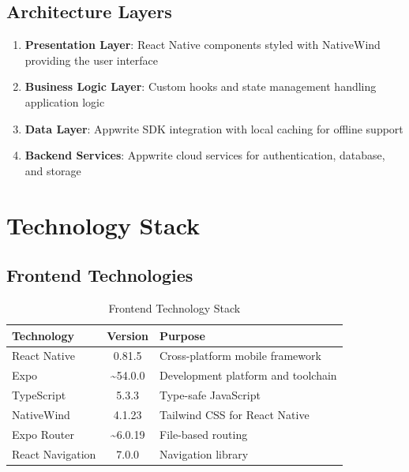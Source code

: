 \documentclass[11pt,a4paper,oneside]{book}
\begin{document}
\section{Architecture Layers}

\begin{enumerate}
    \item \textbf{Presentation Layer}: React Native components styled with NativeWind providing the user interface
    \item \textbf{Business Logic Layer}: Custom hooks and state management handling application logic
    \item \textbf{Data Layer}: Appwrite SDK integration with local caching for offline support
    \item \textbf{Backend Services}: Appwrite cloud services for authentication, database, and storage
\end{enumerate}

\chapter{Technology Stack}

\section{Frontend Technologies}

\begin{table}[h]
\centering
\begin{tabularx}{\textwidth}{l c X}
\toprule
\textbf{Technology} & \textbf{Version} & \textbf{Purpose} \\
\midrule
React Native & 0.81.5 & Cross-platform mobile framework \\
Expo & \textasciitilde{}54.0.0 & Development platform and toolchain \\
TypeScript & \textasciicirc{}5.3.3 & Type-safe JavaScript \\
NativeWind & \textasciicirc{}4.1.23 & Tailwind CSS for React Native \\
Expo Router & \textasciitilde{}6.0.19 & File-based routing \\
React Navigation & \textasciicirc{}7.0.0 & Navigation library \\
\bottomrule
\end{tabularx}
\caption{Frontend Technology Stack}
\end{table}
\end{document}
